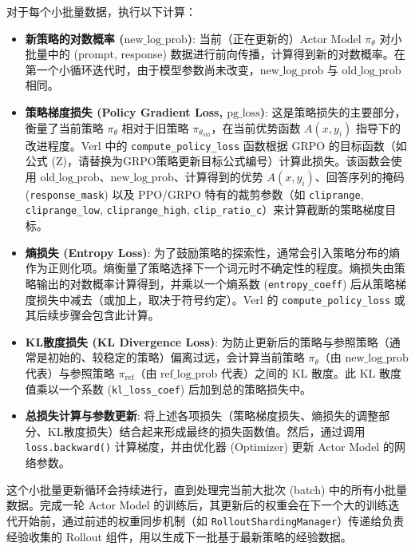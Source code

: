 \documentclass{pkuthesis}
\begin{document}
对于每个小批量数据，执行以下计算：
\begin{itemize}
    \item \textbf{新策略的对数概率 ($\text{new\_log\_prob}$)}: 当前（正在更新的）Actor Model $\pi_{\theta}$ 对小批量中的 (prompt, response) 数据进行前向传播，计算得到新的对数概率。在第一个小循环迭代时，由于模型参数尚未改变，$\text{new\_log\_prob}$ 与 $\text{old\_log\_prob}$ 相同。

    \item \textbf{策略梯度损失 (Policy Gradient Loss, $\text{pg\_loss}$)}: 这是策略损失的主要部分，衡量了当前策略 $\pi_{\theta}$ 相对于旧策略 $\pi_{\theta_{\text{old}}}$，在当前优势函数 $A(x, y_i)$ 指导下的改进程度。Verl 中的 \texttt{compute\_policy\_loss} 函数根据 GRPO 的目标函数（如公式 (Z)，请替换为GRPO策略更新目标公式编号）计算此损失。该函数会使用 $\text{old\_log\_prob}$、$\text{new\_log\_prob}$、计算得到的优势 $A(x, y_i)$、回答序列的掩码 (\texttt{response\_mask}) 以及 PPO/GRPO 特有的裁剪参数（如 \texttt{cliprange}, \texttt{cliprange\_low}, \texttt{cliprange\_high}, \texttt{clip\_ratio\_c}）来计算截断的策略梯度目标。

    \item \textbf{熵损失 (Entropy Loss)}: 为了鼓励策略的探索性，通常会引入策略分布的熵作为正则化项。熵衡量了策略选择下一个词元时不确定性的程度。熵损失由策略输出的对数概率计算得到，并乘以一个熵系数 (\texttt{entropy\_coeff}) 后从策略梯度损失中减去（或加上，取决于符号约定）。Verl 的 \texttt{compute\_policy\_loss} 或其后续步骤会包含此计算。

    \item \textbf{KL散度损失 (KL Divergence Loss)}: 为防止更新后的策略与参照策略（通常是初始的、较稳定的策略）偏离过远，会计算当前策略 $\pi_{\theta}$（由 $\text{new\_log\_prob}$ 代表）与参照策略 $\pi_{\text{ref}}$（由 $\text{ref\_log\_prob}$ 代表）之间的 KL 散度。此 KL 散度值乘以一个系数 (\texttt{kl\_loss\_coef}) 后加到总的策略损失中。

    \item \textbf{总损失计算与参数更新}: 将上述各项损失（策略梯度损失、熵损失的调整部分、KL散度损失）结合起来形成最终的损失函数值。然后，通过调用 \texttt{loss.backward()} 计算梯度，并由优化器 (Optimizer) 更新 Actor Model 的网络参数。
\end{itemize}
这个小批量更新循环会持续进行，直到处理完当前大批次 (batch) 中的所有小批量数据。完成一轮 Actor Model 的训练后，其更新后的权重会在下一个大的训练迭代开始前，通过前述的权重同步机制（如 \texttt{RolloutShardingManager}）传递给负责经验收集的 Rollout 组件，用以生成下一批基于最新策略的经验数据。
\end{document}
